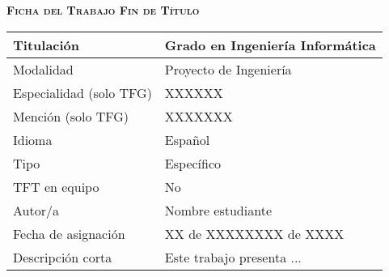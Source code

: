 \textsc{\textbf{Ficha del Trabajo Fin de Título}}

\begin{tabular}{|l|p{10cm}|}
    \hline \hline
    Titulación & Grado en Ingeniería Informática \\ \hline
    Modalidad & Proyecto de Ingeniería \\ \hline
    Especialidad (solo TFG) & XXXXXX \\ \hline
    Mención (solo TFG) & XXXXXXX \\ \hline
    Idioma & Español \\ \hline
    Tipo & Específico \\ \hline
    TFT en equipo & No \\ \hline
    Autor/a & Nombre estudiante \\ \hline
    Fecha de asignación & XX de XXXXXXXX de XXXX  \\ \hline
    Descripción corta & Este trabajo presenta ... \\ \hline
    \hline
\end{tabular}
  